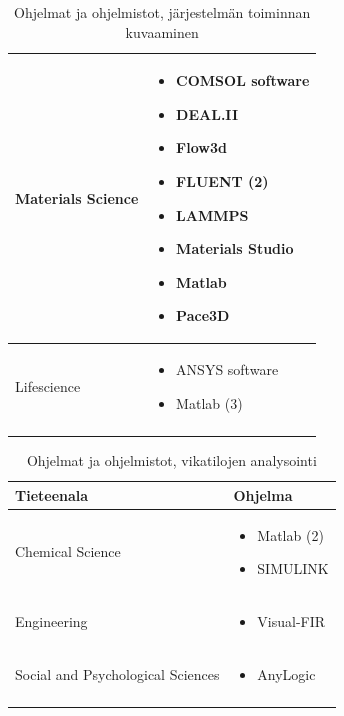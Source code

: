 \documentclass[utf8]{gradu3}
\begin{document}
\begin{longtable}[h]{|p{5cm}|p{8cm}|}
    \hline
    Materials Science & \begin{itemize}
        \item COMSOL software 
        \item DEAL.II
        \item Flow3d
        \item FLUENT (2)
        \item LAMMPS
        \item Materials Studio
        \item Matlab
        \item Pace3D 
    \end{itemize} \\
    \hline
    Lifescience & \begin{itemize}
        \item ANSYS software
        \item Matlab (3)
    \end{itemize} \\
    \hline
    \caption{Ohjelmat ja ohjelmistot, järjestelmän toiminnan kuvaaminen}
    \label{table:ohjelmistot 1.}
\end{longtable}

\pagebreak

\begin{longtable}[h]{|p{5cm}|p{8cm}|}
    \hline
    \textbf{Tieteenala}    &    \textbf{Ohjelma}\\
    \hline
    Chemical Science & \begin{itemize}
        \item Matlab (2)
        \item SIMULINK
    \end{itemize} \\
    \hline
    Engineering & \begin{itemize}
        \item Visual-FIR
    \end{itemize} \\
    \hline
    Social and Psychological Sciences & \begin{itemize}
        \item AnyLogic
    \end{itemize} \\   
    \hline
    \caption{Ohjelmat ja ohjelmistot, vikatilojen analysointi}
    \label{table:ohjelmistot 2.}
\end{longtable}
\end{document}

